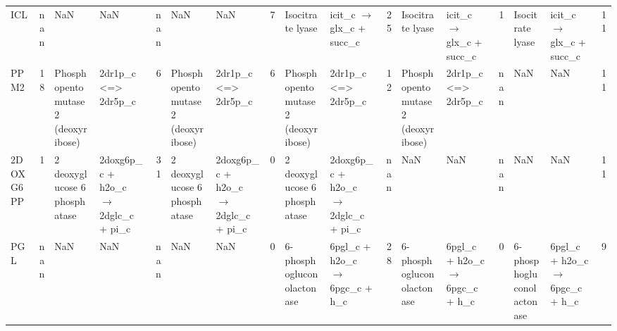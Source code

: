 \begin{tabular}{lrllrllrllrllrllr}
ICL      & nan &  NaN &  NaN & nan &  NaN &  NaN & 7 &  Isocitrate lyase &  icit\_c $\rightarrow$ glx\_c + succ\_c & 25 &  Isocitrate lyase &  icit\_c $\rightarrow$ glx\_c + succ\_c & 1 &  Isocitrate lyase &  icit\_c $\rightarrow$ glx\_c + succ\_c & 11 \\
PPM2     & 18 &  Phosphopentomutase 2 (deoxyribose) &  2dr1p\_c <=> 2dr5p\_c & 6 &  Phosphopentomutase 2 (deoxyribose) &  2dr1p\_c <=> 2dr5p\_c & 6 &  Phosphopentomutase 2 (deoxyribose) &  2dr1p\_c <=> 2dr5p\_c & 12 &  Phosphopentomutase 2 (deoxyribose) &  2dr1p\_c <=> 2dr5p\_c & nan &  NaN &  NaN & 11 \\
2DOXG6PP & 1 &  2 deoxyglucose 6 phosphatase &  2doxg6p\_c + h2o\_c $\rightarrow$ 2dglc\_c + pi\_c & 31 &  2 deoxyglucose 6 phosphatase &  2doxg6p\_c + h2o\_c $\rightarrow$ 2dglc\_c + pi\_c & 0 &  2 deoxyglucose 6 phosphatase &  2doxg6p\_c + h2o\_c $\rightarrow$ 2dglc\_c + pi\_c & nan &  NaN &  NaN & nan &  NaN &  NaN & 11 \\
PGL      & nan &  NaN &  NaN & nan &  NaN &  NaN & 0 &  6-phosphogluconolactonase &  6pgl\_c + h2o\_c $\rightarrow$ 6pgc\_c + h\_c & 28 &  6-phosphogluconolactonase &  6pgl\_c + h2o\_c $\rightarrow$ 6pgc\_c + h\_c & 0 &  6-phosphogluconolactonase &  6pgl\_c + h2o\_c $\rightarrow$ 6pgc\_c + h\_c & 9 \\
\bottomrule
\end{tabular}
